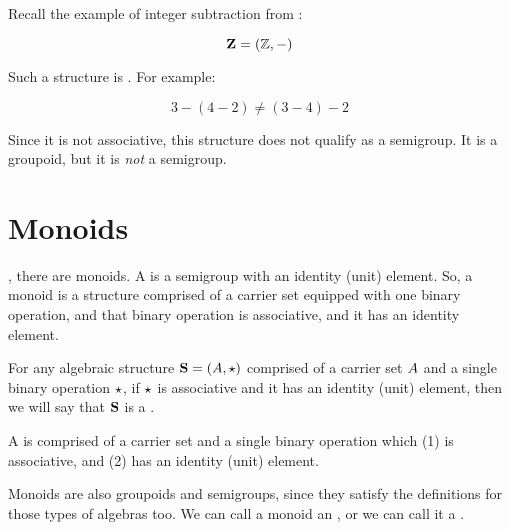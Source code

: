 \documentclass[../../../main.tex]{subfiles}
\begin{document}
\begin{example}

Recall the example of integer subtraction from :

\begin{equation*}
  \algebra{Z} = (\Ints/, -)
\end{equation*} 

Such a structure is . For example:

\begin{equation*}
  3 - (4 - 2) \not = (3 - 4) - 2
\end{equation*}

Since it is not associative, this structure does not qualify as a semigroup. It is a groupoid, but it is \emph{not} a semigroup.

\end{example}


\section{Monoids}

, there are monoids. A  is a semigroup with an identity (unit) element. So, a monoid is a structure comprised of a carrier set equipped with one binary operation, and that binary operation is associative, and it has an identity element.

\begin{fdefinition}[Monoid]
  \label{def:monoid}
  For any algebraic structure $\algebra{S} = (\set{A}, \opSymbol/)$ comprised of a carrier set $A$ and a single binary operation $\opSymbol/$, if $\opSymbol/$ is associative and it has an identity (unit) element, then we will say that $\mathbf{S}$ is a .
\end{fdefinition}

\begin{terminology}
  A  is comprised of a carrier set and a single binary operation which (1) is associative, and (2) has an identity (unit) element.
\end{terminology}

Monoids are also groupoids and semigroups, since they satisfy the definitions for those types of algebras too. We can call a monoid an , or we can call it a .
\end{document}
